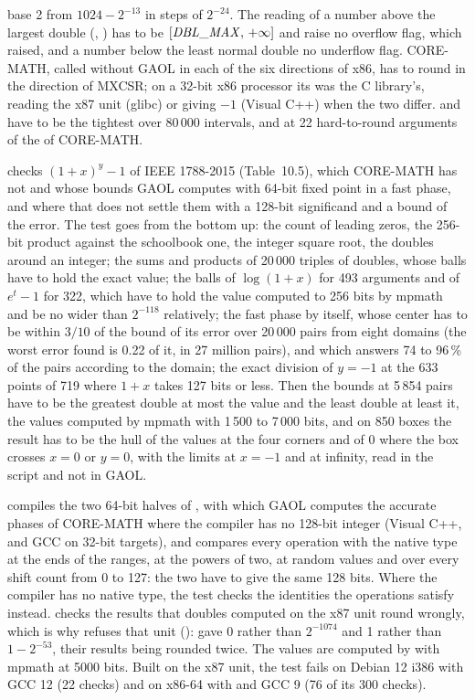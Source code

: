base 2 from $1024-2^{-13}$ in steps of $2^{-24}$.\newinvfive{} The reading
of a number above the largest double (, ) has to
be $[\mathit{DBL\_MAX},\,+\infty]$ and raise no overflow flag, which
 raised, and a number below the least normal double no
underflow flag.\newinvfive{} CORE-MATH, called without GAOL in each of the
six directions of x86, has to round in the direction of MXCSR; on a 32-bit
x86 processor its  was the C library's, reading the x87
unit (glibc) or giving $-1$ (Visual C++) when the two differ. 
and  have to be the tightest over 80\,000 intervals, and at 22
hard-to-round arguments of the  of CORE-MATH.

\medskip
{} checks $(1+x)^y-1$ of IEEE 1788-2015 (Table~10.5), which
CORE-MATH has not and whose bounds GAOL computes with 64-bit fixed point in
a fast phase, and where that does not settle them with a 128-bit
significand and a bound of the error.\newinvfive{} The test goes from the
bottom up: the count of leading zeros, the 256-bit product against the
schoolbook one, the integer square root, the doubles around an integer; the
sums and products of 20\,000 triples of doubles, whose balls have to hold
the exact value; the balls of $\log(1+x)$ for 493 arguments and of $e^t-1$
for 322, which have to hold the value computed to 256 bits by mpmath and be
no wider than $2^{-118}$ relatively; the fast phase by itself, whose center
has to be within $3/10$ of the bound of its error over 20\,000 pairs from
eight domains (the worst error found is 0.22 of it, in 27 million pairs),
and which answers 74 to 96\,\% of the pairs according to the domain; the
exact division of $y=-1$ at the 633 points of 719 where $1+x$ takes 127 bits
or less. Then the bounds at 5\,854 pairs have to be the greatest double at
most the value and the least double at least it, the values computed by
mpmath with 1\,500 to 7\,000 bits, and on 850 boxes the result has to be
the hull of the values at the four corners and of 0 where the box crosses
$x=0$ or $y=0$, with the limits at $x=-1$ and at infinity, read in the
script and not in GAOL.

\medskip
{} compiles the two 64-bit halves of ,
with which GAOL computes the accurate phases of CORE-MATH where the compiler
has no 128-bit integer (Visual C++, and GCC on 32-bit targets), and compares
every operation with the native type at the ends of the ranges, at the
powers of two, at random values and over every shift count from 0 to 127:
the two have to give the same 128 bits. Where the compiler has no native
type, the test checks the identities the operations satisfy instead.
 checks the results that doubles computed on the
x87 unit round wrongly, which is why  refuses
that unit ():  gave 0
rather than $2^{-1074}$ and  1 rather
than $1-2^{-53}$, their results being rounded twice. The values are computed
by  with mpmath at 5000 bits. Built on
the x87 unit, the test fails on Debian 12 i386 with GCC 12 (22 checks) and
on x86-64 with  and GCC 9 (76 of its 300 checks).

